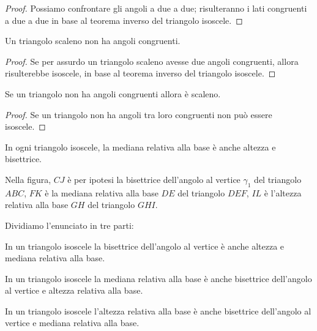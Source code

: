 \begin{proof}
Possiamo confrontare gli angoli a due a due; risulteranno i lati congruenti a due a due in base al teorema inverso del triangolo isoscele.
\end{proof}

\begin{corollario}
Un triangolo scaleno non ha angoli congruenti.
\end{corollario}

\begin{proof}
Se per assurdo un triangolo scaleno avesse due angoli congruenti, allora risulterebbe isoscele, in base al teorema inverso del triangolo isoscele.
\end{proof}

\begin{corollario}
Se un triangolo non ha angoli congruenti allora è scaleno.
\end{corollario}

\begin{proof}
Se un triangolo non ha angoli tra loro congruenti non può essere isoscele.
\end{proof}

\begin{proposizione}
In ogni triangolo isoscele, la mediana relativa alla base è anche altezza e bisettrice.
\end{proposizione}
Nella figura, $CJ$ è per ipotesi la bisettrice dell'angolo al vertice $\gamma_1$ del triangolo $ABC$, $FK$ è la mediana relativa alla base $DE$ del triangolo $DEF$, $IL$ è l'altezza relativa alla base $GH$ del triangolo $GHI$.

\begin{figure}[htb]
\centering
\end{figure}

Dividiamo l'enunciato in tre parti:
\begin{enumeratea}
\item In un triangolo isoscele la bisettrice dell'angolo al vertice è anche altezza e mediana relativa alla base.
\item In un triangolo isoscele la mediana relativa alla base è anche bisettrice dell'angolo al vertice e altezza relativa alla base.
\item In un triangolo isoscele l'altezza relativa alla base è anche bisettrice dell'angolo al vertice e mediana relativa alla base.
\end{enumeratea}

